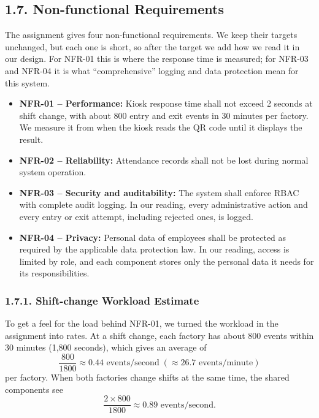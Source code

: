 \subsection*{1.7. Non-functional Requirements}

{}

The assignment gives four non-functional requirements. We keep their targets unchanged, but each one is short, so after the target we add how we read it in our design. For NFR-01 this is where the response time is measured; for NFR-03 and NFR-04 it is what ``comprehensive'' logging and data protection mean for this system.

\begin{itemize}[leftmargin=36pt, itemsep=2pt, topsep=4pt, parsep=2pt]
  \item \textbf{NFR-01 -- Performance:} Kiosk response time shall not exceed 2 seconds at shift change, with about 800 entry and exit events in 30 minutes per factory. We measure it from when the kiosk reads the QR code until it displays the result.
  \item \textbf{NFR-02 -- Reliability:} Attendance records shall not be lost during normal system operation.
  \item \textbf{NFR-03 -- Security and auditability:} The system shall enforce RBAC with complete audit logging. In our reading, every administrative action and every entry or exit attempt, including rejected ones, is logged.
  \item \textbf{NFR-04 -- Privacy:} Personal data of employees shall be protected as required by the applicable data protection law. In our reading, access is limited by role, and each component stores only the personal data it needs for its responsibilities.
\end{itemize}

\subsubsection*{1.7.1. Shift-change Workload Estimate}

{}

To get a feel for the load behind NFR-01, we turned the workload in the assignment into rates. At a shift change, each factory has about 800 events within 30 minutes (1,800 seconds), which gives an average of
\[
\frac{800}{1800} \approx 0.44 \mbox{ events/second} \;(\approx 26.7 \mbox{ events/minute})
\]
per factory. When both factories change shifts at the same time, the shared components see
\[
\frac{2 \times 800}{1800} \approx 0.89 \mbox{ events/second}.
\]

